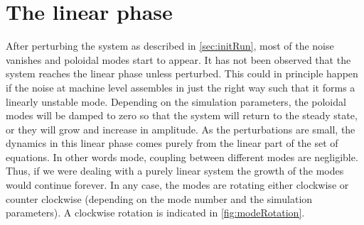 \section{The linear phase}
%
After perturbing the system as described in \cref{sec:initRun}, most of the noise vanishes and poloidal modes start to appear.
It has not been observed that the system reaches the linear phase unless perturbed.
This could in principle happen if the noise at machine level assembles in just the right way such that it forms a linearly unstable mode.
Depending on the simulation parameters, the poloidal modes will be damped to zero so that the system will return to the steady state, or they will grow and increase in amplitude.
As the perturbations are small, the dynamics in this linear phase comes purely from the linear part of the set of equations.
In other words mode, coupling between different modes are negligible.
Thus, if we were dealing with a purely linear system the growth of the modes would continue forever.
In any case, the modes are rotating either clockwise or counter clockwise (depending on the mode number and the simulation parameters).
A clockwise rotation is indicated in \cref{fig:modeRotation}.
%
